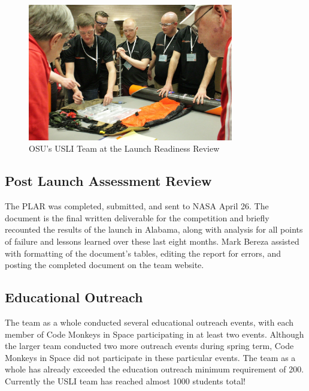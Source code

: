 \documentclass[onecolumn, draftclsnofoot, 10pt, compsoc]{IEEEtran}
\begin{document}
\begin{figure}[H]
	\centering
	\includegraphics[width=0.8\textwidth]{LRR.jpg}
	\caption{OSU's USLI Team at the Launch Readiness Review}
    \label{figure:Launch Readiness Review}
\end{figure}

\subsection{Post Launch Assessment Review}
The PLAR was completed, submitted, and sent to NASA April 26. The document is the final written deliverable for the competition and briefly recounted the results of the launch in Alabama, along with analysis for all points of failure and lessons learned over these last eight months. Mark Bereza assisted with formatting of the document's tables, editing the report for errors, and posting the completed document on the team website.

\subsection{Educational Outreach}
The team as a whole conducted several educational outreach events, with each member of Code Monkeys in Space participating in at least two events. Although the larger team conducted two more outreach events during spring term, Code Monkeys in Space did not participate in these particular events. The team as a whole has already exceeded the education outreach minimum requirement of 200. Currently the USLI team has reached almost 1000 students total!
\end{document}

